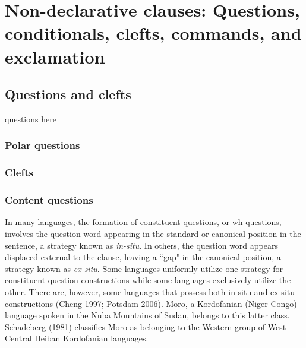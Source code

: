 \part{Non-declarative clauses: Questions, conditionals, clefts, commands, and exclamation}%

\chapter{Questions and clefts}\label{question}

questions here

\section{Polar questions}\label{ynquestion}



\section{Clefts}\label{clefts}

\section{Content questions}\label{content}

In many languages, the formation of constituent questions, or wh-questions, involves the question word appearing in the standard or canonical position in the sentence, a strategy known as \textit{in-situ}. In others, the question word appears displaced external to the clause, leaving a ``gap" in the canonical position, a strategy known as \textit{ex-situ}.  Some languages uniformly utilize one strategy for constituent question constructions while some languages exclusively utilize the other. There are, however, some languages that possess both in-situ and ex-situ constructions (Cheng 1997; Potsdam 2006). Moro, a Kordofanian (Niger-Congo) language spoken in the Nuba Mountains of Sudan, belongs to this latter class.  Schadeberg (1981) classifies Moro as belonging to the Western group of West-Central Heiban Kordofanian languages. 

